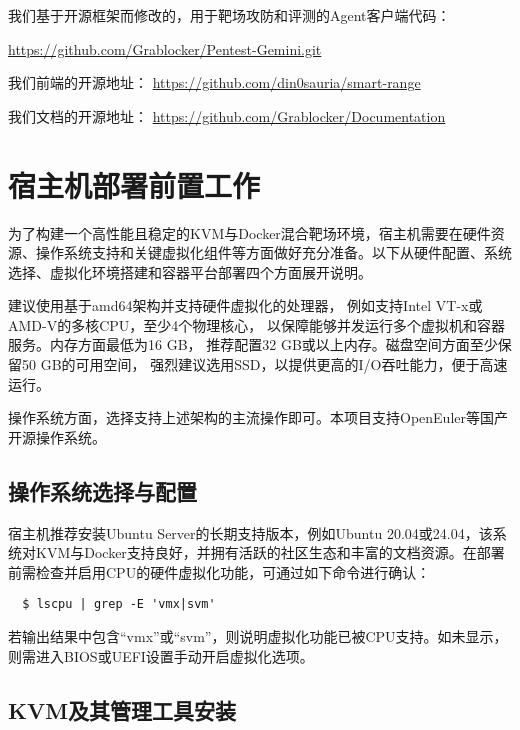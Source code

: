\documentclass[lang=cn,10pt]{elegantbook}
\begin{document}
我们基于开源框架而修改的，用于靶场攻防和评测的Agent客户端代码：

\href{https://github.com/Grablocker/Pentest-Gemini.git}{https://github.com/Grablocker/Pentest-Gemini.git}

我们前端的开源地址：
\href{https://github.com/din0sauria/smart_range}{https://github.com/din0sauria/smart-range}

我们文档的开源地址：
\href{https://github.com/Grablocker/Documentation}{https://github.com/Grablocker/Documentation}





\section{宿主机部署前置工作}

为了构建一个高性能且稳定的KVM与Docker混合靶场环境，宿主机需要在硬件资源、操作系统支持和关键虚拟化组件等方面做好充分准备。以下从硬件配置、系统选择、虚拟化环境搭建和容器平台部署四个方面展开说明。

\begin{proposition}
  建议使用基于amd64架构并支持硬件虚拟化的处理器，
  例如支持Intel VT-x或AMD-V的多核CPU，至少4个物理核心，
  以保障能够并发运行多个虚拟机和容器服务。内存方面最低为16 GB，
  推荐配置32 GB或以上内存。磁盘空间方面至少保留50 GB的可用空间，
  强烈建议选用SSD，以提供更高的I/O吞吐能力，便于高速运行。
  
  操作系统方面，选择支持上述架构的主流操作即可。本项目支持OpenEuler等国产开源操作系统。
\end{proposition}


\subsection{操作系统选择与配置}

宿主机推荐安装Ubuntu Server的长期支持版本，例如Ubuntu 20.04或24.04，该系统对KVM与Docker支持良好，并拥有活跃的社区生态和丰富的文档资源。在部署前需检查并启用CPU的硬件虚拟化功能，可通过如下命令进行确认：


\begin{verbatim}
  $ lscpu | grep -E 'vmx|svm'
\end{verbatim}

若输出结果中包含“vmx”或“svm”，则说明虚拟化功能已被CPU支持。如未显示，则需进入BIOS或UEFI设置手动开启虚拟化选项。

\subsection{KVM及其管理工具安装}
\end{document}
